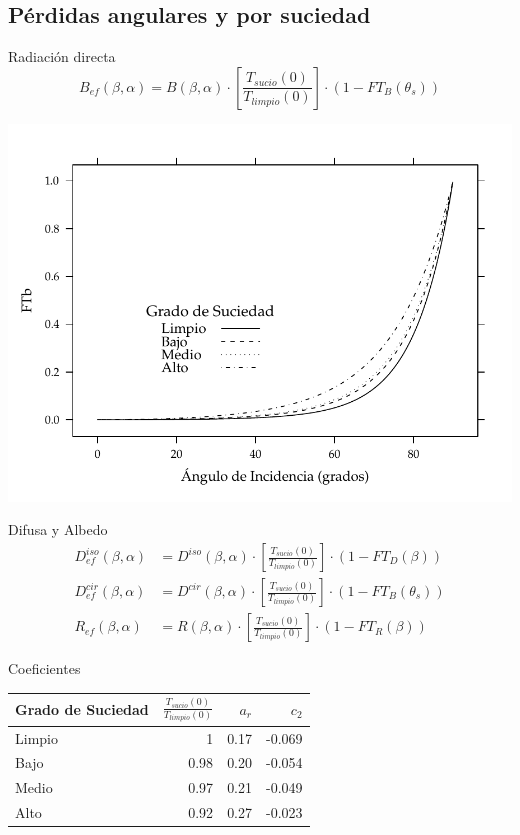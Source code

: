 \documentclass[xcolor={usenames,svgnames,dvipsnames}]{beamer}
\begin{document}
\subsection{Pérdidas angulares y por suciedad}
\label{sec:org9743a60}

\begin{frame}[label={sec:org56f49df}]{Radiación directa}
\[B_{ef}(\beta,\alpha)=B(\beta,\alpha)\cdot\left[\frac{T_{sucio}(0)}{T_{limpio}(0)}\right]\cdot (1-FT_{B}(\theta_{s}))\]

\begin{center}
\includegraphics[width=.9\linewidth]{../figs/Suciedad.pdf}
\end{center}
\end{frame}

\begin{frame}[label={sec:org082fa91}]{Difusa y Albedo}
\begin{align*}
D_{ef}^{iso}(\beta,\alpha) &= D^{iso}(\beta,\alpha)\cdot\left[\frac{T_{sucio}(0)}{T_{limpio}(0)}\right]\cdot(1-FT_{D}(\beta))\\
D_{ef}^{cir}(\beta,\alpha) &= D^{cir}(\beta,\alpha)\cdot\left[\frac{T_{sucio}(0)}{T_{limpio}(0)}\right]\cdot(1-FT_{B}(\theta_{s}))\\
R_{ef}(\beta,\alpha) &= R(\beta,\alpha)\cdot\left[\frac{T_{sucio}(0)}{T_{limpio}(0)}\right]\cdot(1-FT_{R}(\beta))
\end{align*}
\end{frame}
\begin{frame}[label={sec:orgcbb0231}]{Coeficientes}
\begin{center}
\begin{tabular}{lrrr}
Grado de Suciedad & \(\frac{T_{sucio}(0)}{T_{limpio}(0)}\) & \(a_{r}\) & \(c_{2}\)\\
\hline
Limpio & 1 & 0.17 & -0.069\\
Bajo & 0.98 & 0.20 & -0.054\\
Medio & 0.97 & 0.21 & -0.049\\
Alto & 0.92 & 0.27 & -0.023\\
\end{tabular}
\end{center}
\end{frame}
\end{document}
